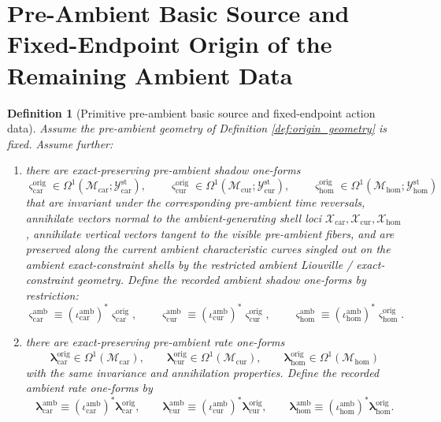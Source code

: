 \documentclass[11pt]{article}
\newcommand{\TensorStatTagClass}{\mathcal Y_{\mathrm{car}}^{\mathrm{st}}}
\newcommand{\CurStatTagClass}{\mathcal Y_{\mathrm{cur}}^{\mathrm{st}}}
\newcommand{\HomStatTagClass}{\mathcal Y_{\mathrm{hom}}^{\mathrm{st}}}
\newcommand{\TensorAmbientSpace}{\mathcal X_{\mathrm{car}}}
\newcommand{\CurAmbientSpace}{\mathcal X_{\mathrm{cur}}}
\newcommand{\HomAmbientSpace}{\mathcal X_{\mathrm{hom}}}
\newcommand{\TensorAmbientShadowForm}{\boldsymbol{\varsigma}_{\mathrm{car}}^{\mathrm{amb}}}
\newcommand{\CurAmbientShadowForm}{\boldsymbol{\varsigma}_{\mathrm{cur}}^{\mathrm{amb}}}
\newcommand{\HomAmbientShadowForm}{\boldsymbol{\varsigma}_{\mathrm{hom}}^{\mathrm{amb}}}
\newcommand{\TensorAmbientRateForm}{\boldsymbol{\lambda}_{\mathrm{car}}^{\mathrm{amb}}}
\newcommand{\CurAmbientRateForm}{\boldsymbol{\lambda}_{\mathrm{cur}}^{\mathrm{amb}}}
\newcommand{\HomAmbientRateForm}{\boldsymbol{\lambda}_{\mathrm{hom}}^{\mathrm{amb}}}
\newcommand{\TensorOriginSpace}{\mathcal M_{\mathrm{car}}}
\newcommand{\CurOriginSpace}{\mathcal M_{\mathrm{cur}}}
\newcommand{\HomOriginSpace}{\mathcal M_{\mathrm{hom}}}
\newcommand{\TensorAmbientInc}{\iota_{\mathrm{car}}^{\mathrm{amb}}}
\newcommand{\CurAmbientInc}{\iota_{\mathrm{cur}}^{\mathrm{amb}}}
\newcommand{\HomAmbientInc}{\iota_{\mathrm{hom}}^{\mathrm{amb}}}
\newcommand{\TensorOriginShadowForm}{\boldsymbol{\varsigma}_{\mathrm{car}}^{\mathrm{orig}}}
\newcommand{\CurOriginShadowForm}{\boldsymbol{\varsigma}_{\mathrm{cur}}^{\mathrm{orig}}}
\newcommand{\HomOriginShadowForm}{\boldsymbol{\varsigma}_{\mathrm{hom}}^{\mathrm{orig}}}
\newcommand{\TensorOriginRateForm}{\boldsymbol{\lambda}_{\mathrm{car}}^{\mathrm{orig}}}
\newcommand{\CurOriginRateForm}{\boldsymbol{\lambda}_{\mathrm{cur}}^{\mathrm{orig}}}
\newcommand{\HomOriginRateForm}{\boldsymbol{\lambda}_{\mathrm{hom}}^{\mathrm{orig}}}
\newtheorem{definition}{Definition}
\begin{document}
\section{Pre-Ambient Basic Source and Fixed-Endpoint Origin of the Remaining Ambient Data}

\begin{definition}[Primitive pre-ambient basic source and fixed-endpoint action data]
\label{def:origin_basic}
Assume the pre-ambient geometry of Definition \ref{def:origin_geometry} is fixed. Assume further:
\begin{enumerate}
    \item there are exact-preserving pre-ambient shadow one-forms
    \[
    \TensorOriginShadowForm\in\Omega^1(\TensorOriginSpace;\TensorStatTagClass),\qquad
    \CurOriginShadowForm\in\Omega^1(\CurOriginSpace;\CurStatTagClass),\qquad
    \HomOriginShadowForm\in\Omega^1(\HomOriginSpace;\HomStatTagClass)
    \]
    that are invariant under the corresponding pre-ambient time reversals, annihilate vectors normal to the ambient-generating shell loci \(\TensorAmbientSpace,\CurAmbientSpace,\HomAmbientSpace\), annihilate vertical vectors tangent to the visible pre-ambient fibers, and are preserved along the current ambient characteristic curves singled out on the ambient exact-constraint shells by the restricted ambient Liouville / exact-constraint geometry. Define the recorded ambient shadow one-forms by restriction:
    \begin{equation}
    \TensorAmbientShadowForm\equiv(\TensorAmbientInc)^*\TensorOriginShadowForm,\qquad
    \CurAmbientShadowForm\equiv(\CurAmbientInc)^*\CurOriginShadowForm,\qquad
    \HomAmbientShadowForm\equiv(\HomAmbientInc)^*\HomOriginShadowForm.
    \label{eq:ambient_shadow_from_origin}
    \end{equation}
    \item there are exact-preserving pre-ambient rate one-forms
    \[
    \TensorOriginRateForm\in\Omega^1(\TensorOriginSpace),\qquad
    \CurOriginRateForm\in\Omega^1(\CurOriginSpace),\qquad
    \HomOriginRateForm\in\Omega^1(\HomOriginSpace)
    \]
    with the same invariance and annihilation properties. Define the recorded ambient rate one-forms by
    \begin{equation}
    \TensorAmbientRateForm\equiv(\TensorAmbientInc)^*\TensorOriginRateForm,\qquad
    \CurAmbientRateForm\equiv(\CurAmbientInc)^*\CurOriginRateForm,\qquad
    \HomAmbientRateForm\equiv(\HomAmbientInc)^*\HomOriginRateForm.
    \label{eq:ambient_rate_from_origin}
    \end{equation}

\end{enumerate}
\end{definition}
\end{document}
